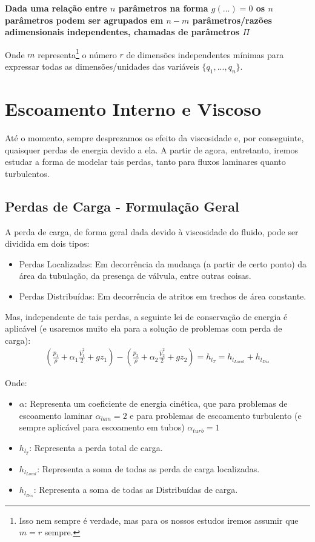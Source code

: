 \documentclass{article}
\begin{document}
\begin{center}
    \textbf{Dada uma relação entre $n$ parâmetros na forma $g(...)=0$ os $n$ parâmetros podem ser agrupados em $n-m$ parâmetros/razões adimensionais independentes, chamadas de parâmetros $\Pi$}
\end{center}

Onde $m$ representa\footnote{Isso nem sempre é verdade, mas para os nossos estudos iremos assumir que $m=r$ sempre.} o número $r$ de dimensões independentes mínimas para expressar todas as dimensões/unidades das variáveis $\{q_1, ..., q_n\}$.

\newpage
\section{Escoamento Interno e Viscoso}
Até o momento, sempre desprezamos os efeito da viscosidade e, por conseguinte, quaisquer perdas de energia devido a ela. A partir de agora, entretanto, iremos estudar a forma de modelar tais perdas, tanto para fluxos laminares quanto turbulentos.

\subsection{Perdas de Carga - Formulação Geral}
A perda de carga, de forma geral dada devido à viscosidade do fluido, pode ser dividida em dois tipos:
\begin{itemize}
    \item Perdas Localizadas: Em decorrência da mudança (a partir de certo ponto) da área da tubulação, da presença de válvula, entre outras coisas.
    \item Perdas Distribuídas: Em decorrência de atritos em trechos de área constante.
\end{itemize}

Mas, independente de tais perdas, a seguinte lei de conservação de energia é aplicável (e usaremos muito ela para a solução de problemas com perda de carga):
\begin{align}
    \left(\frac{p_1}{\rho} + \alpha_1 \frac{\bar{V}^2_1}{2} + gz_1\right) - \left(\frac{p_2}{\rho} + \alpha_2 \frac{\bar{V}^2_2}{2} + gz_2\right) = h_{l_{T}} = h_{l_{Local}} + h_{l_{Dis}}
\end{align}

Onde:
\begin{itemize}
    \item $\alpha$: Representa um coeficiente de energia cinética, que para problemas de escoamento laminar $\alpha_{lam} = 2$ e para problemas de escoamento turbulento (e sempre aplicável para escoamento em tubos) $\alpha_{turb} = 1$
    \item $h_{l_{T}}$: Representa a perda total de carga.
    \item $h_{l_{Local}}$: Representa a soma de todas as perda de carga localizadas.
    \item $h_{l_{Dis}}$: Representa a soma de todas as Distribuídas de carga.
\end{itemize}
\end{document}
